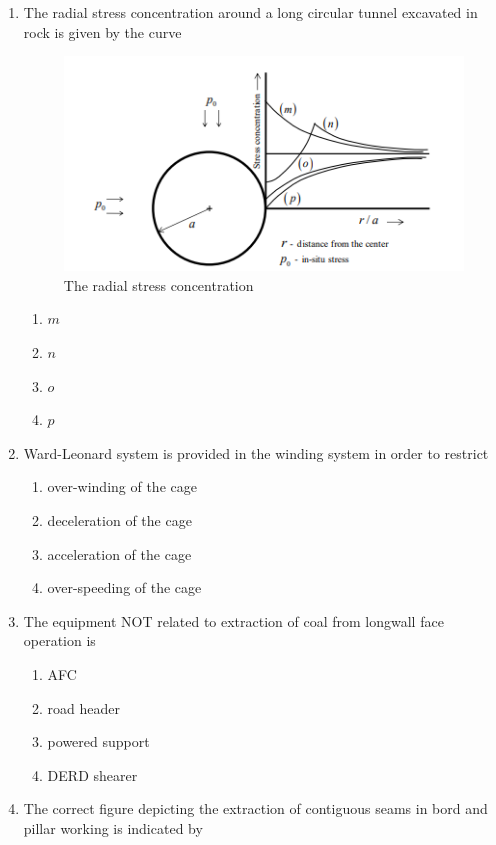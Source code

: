 \documentclass[journal,12pt,onecolumn]{IEEEtran}
\theoremstyle{remark}
\begin{document}
\begin{enumerate}
\item The radial stress concentration around a long circular tunnel excavated in rock is given by the curve
\begin{figure}[H]
  \centering
  \includegraphics[width=0.4\columnwidth]{figs/dia1.png}
  \caption{The radial stress concentration}
  \label{fig:dai1}
\end{figure}
\begin{multicols}{2}
\begin{enumerate}
\item $m$ 
\item $n$ 
\item $o$
\item $p$
\end{enumerate}
\end{multicols}

\item Ward-Leonard system is provided in the winding system in order to restrict

\hfill{}
\begin{multicols}{2}
\begin{enumerate}
\item over-winding of the cage 
\item deceleration of the cage
\item acceleration of the cage  
\item over-speeding of the cage
\end{enumerate}
\end{multicols}

\item The equipment NOT related to extraction of coal from longwall face operation is

\hfill{}
\begin{multicols}{4}
\begin{enumerate}
\item AFC
\item road header
\item powered support
\item DERD shearer
\end{enumerate}
\end{multicols}
\item The correct figure depicting the extraction of contiguous seams in bord and pillar working is indicated by


\end{enumerate}
\end{document}
